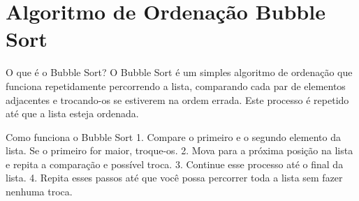 \section{Algoritmo de Ordenação Bubble Sort}

\begin{frame}{O que é o Bubble Sort?}
O Bubble Sort é um simples algoritmo de ordenação que funciona repetidamente percorrendo a lista, comparando cada par de elementos adjacentes e trocando-os se estiverem na ordem errada. Este processo é repetido até que a lista esteja ordenada.
\end{frame}

\begin{frame}{Como funciona o Bubble Sort}
1. Compare o primeiro e o segundo elemento da lista. Se o primeiro for maior, troque-os.
2. Mova para a próxima posição na lista e repita a comparação e possível troca.
3. Continue esse processo até o final da lista.
4. Repita esses passos até que você possa percorrer toda a lista sem fazer nenhuma troca.
\end{frame}
